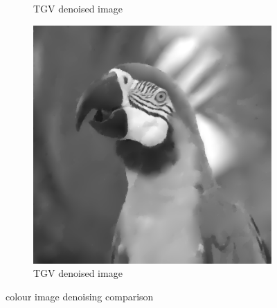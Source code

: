\documentclass{article}
\begin{document}
\begin{figure}[htbp]
\begin{subfigure}[b]{0.24\textwidth}
        \caption{TGV denoised image}
        \label{fig:TFVdenoised_colour}
    \end{subfigure}
    \begin{subfigure}[b]{0.24\textwidth}
        \centering
        \includegraphics[width=\textwidth]{images/TGVdenoised_gray.png}
        \caption{TGV denoised image}
        \label{fig:TVdenoised_colour}
    \end{subfigure}
    \vspace{.3cm}

    \caption{colour image denoising comparison}
    \label{fig:colour_comparison}
\end{figure}


 \label{bib}
\end{document}
